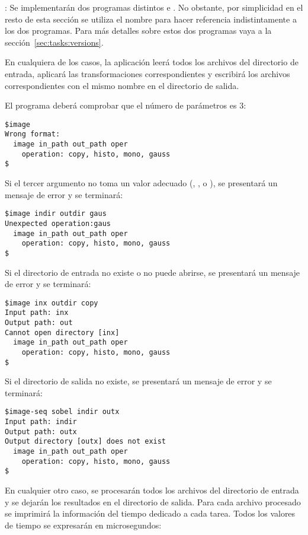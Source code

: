 : Se implementarán dos programas distintos 
e . No obstante, por simplicidad en el resto de esta
sección se utiliza el nombre  para hacer referencia
indistintamente a los dos programas.
Para más detalles sobre estos dos programas vaya a la sección~\ref{sec:tasks:versions}.

En cualquiera de los casos, la aplicación leerá todos los archivos
del directorio de entrada, aplicará las transformaciones
correspondientes y escribirá los archivos correspondientes con el
mismo nombre en el directorio de salida.

El programa deberá comprobar que el número de parámetros es 3:

\begin{lstlisting}[style=terminal]
$image
Wrong format:
  image in_path out_path oper
    operation: copy, histo, mono, gauss
$
\end{lstlisting}

Si el tercer argumento no toma un valor adecuado (, ,  o ), 
se presentará un mensaje de error y se terminará:

\begin{lstlisting}[style=terminal]
$image indir outdir gaus
Unexpected operation:gaus
  image in_path out_path oper
    operation: copy, histo, mono, gauss
$
\end{lstlisting}

Si el directorio de entrada no existe o no puede abrirse, se presentará un mensaje de error y se terminará:

\begin{lstlisting}[style=terminal]
$image inx outdir copy
Input path: inx
Output path: out
Cannot open directory [inx]
  image in_path out_path oper
    operation: copy, histo, mono, gauss
$
\end{lstlisting}

Si el directorio de salida no existe, se presentará un mensaje de error y se terminará:

\begin{lstlisting}[style=terminal]
$image-seq sobel indir outx
Input path: indir
Output path: outx
Output directory [outx] does not exist
  image in_path out_path oper
    operation: copy, histo, mono, gauss
$
\end{lstlisting}

En cualquier otro caso, se procesarán todos los archivos del directorio de entrada y se dejarán los resultados en el directorio de salida. Para cada archivo procesado se imprimirá la información del tiempo dedicado a cada tarea. Todos los valores de tiempo se expresarán en microsegundos:

